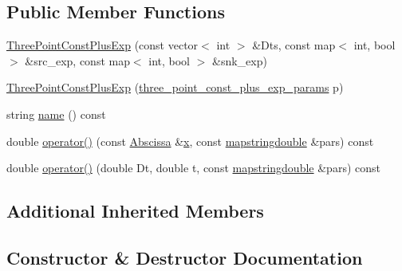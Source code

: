 \subsection*{Public Member Functions}
\begin{DoxyCompactItemize}
\item 
\mbox{\hyperlink{classThreePointConstPlusExp_ab0cf1aae2e4f7ff41125b1134828a651}{Three\+Point\+Const\+Plus\+Exp}} (const vector$<$ int $>$ \&Dts, const map$<$ int, bool $>$ \&src\+\_\+exp, const map$<$ int, bool $>$ \&snk\+\_\+exp)
\item 
\mbox{\hyperlink{classThreePointConstPlusExp_a22e4550ffd1bd789ab3a010d019fa2bd}{Three\+Point\+Const\+Plus\+Exp}} (\mbox{\hyperlink{structthree__point__const__plus__exp__params}{three\+\_\+point\+\_\+const\+\_\+plus\+\_\+exp\+\_\+params}} p)
\item 
string \mbox{\hyperlink{classThreePointConstPlusExp_ad7943ef83c3c7b511612e030797ece4a}{name}} () const
\item 
double \mbox{\hyperlink{classThreePointConstPlusExp_aabb955a37221d2dc9cff3528a1564584}{operator()}} (const \mbox{\hyperlink{classAbscissa}{Abscissa}} \&\mbox{\hyperlink{old__edb_8cc_a63584b830e7aaacb521b11b72291a4bc}{x}}, const \mbox{\hyperlink{lib_2fitting__lib_2includes_8h_a647b481c557c7966517f753340a81d13}{mapstringdouble}} \&pars) const
\item 
double \mbox{\hyperlink{classThreePointConstPlusExp_abe81611888105afdb0014bc1b9c2c269}{operator()}} (double Dt, double t, const \mbox{\hyperlink{lib_2fitting__lib_2includes_8h_a647b481c557c7966517f753340a81d13}{mapstringdouble}} \&pars) const
\end{DoxyCompactItemize}
\subsection*{Additional Inherited Members}


\subsection{Constructor \& Destructor Documentation}
\mbox{\label{classThreePointConstPlusExp_ab0cf1aae2e4f7ff41125b1134828a651}} 
